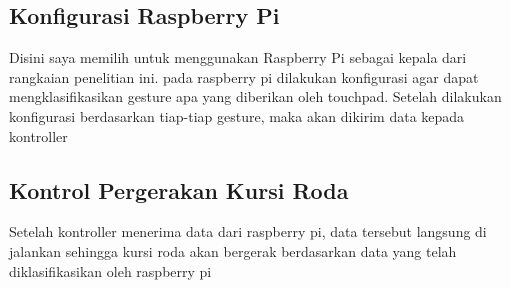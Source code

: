 \subsection{Konfigurasi Raspberry Pi}
Disini saya memilih untuk menggunakan Raspberry Pi sebagai kepala dari rangkaian penelitian ini. pada raspberry pi dilakukan konfigurasi agar dapat mengklasifikasikan gesture apa yang diberikan oleh touchpad. Setelah dilakukan konfigurasi berdasarkan tiap-tiap gesture, maka akan dikirim data kepada kontroller

\subsection{Kontrol Pergerakan Kursi Roda}
Setelah kontroller menerima data dari raspberry pi, data tersebut langsung di jalankan sehingga kursi roda akan bergerak berdasarkan data yang telah diklasifikasikan oleh raspberry pi


